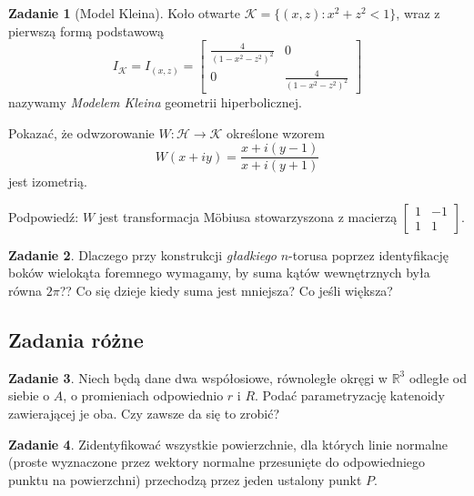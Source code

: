 \documentclass[a4paper,11pt]{article}
\theoremstyle{definition}\newtheorem{exercise}{Zadanie}
\theoremstyle{definition}\newtheorem{remark}{Uwaga}
\begin{document}
\begin{exercise}[Model Kleina]
Koło otwarte $\mathcal{K}=\{(x,z)\colon x^2 + z ^2 < 1\}$, wraz z pierwszą 
formą podstawową
\[I_{\mathcal{K}}=I_{(x,z)}
=\left[
\begin{array}{cc}
\frac{4}{(1-x^2-z^2)^2} & 0\\
0 & \frac{4}{(1-x^2-z^2)^2}
\end{array}
\right]
\]
nazywamy \textit{Modelem Kleina} geometrii hiperbolicznej.

Pokazać, że odwzorowanie $W\colon \mathcal{H}\to \mathcal{K}$ określone wzorem
\[W(x+iy)=\frac{x+i(y-1)}{x+i(y+1)}\]jest izometrią.

\small{Podpowiedź: $W$ jest transformacja M\"obiusa stowarzyszona z 
macierzą 
$\left[
\begin{array}{cc}
1 &-1\\
1 & 1
\end{array}
\right].$}

\end{exercise}

\begin{exercise}
Dlaczego przy konstrukcji \textit{gładkiego} $n$\nobreakdash-torusa poprzez 
identyfikację bok\'ow wielokąta foremnego wymagamy, by suma kąt\'ow 
wewnętrznych była r\'owna $2\pi$?? Co się dzieje kiedy suma jest mniejsza? Co 
jeśli większa?
\end{exercise}



\subsection{Zadania r\'ożne}
\begin{exercise}
Niech będą dane dwa współosiowe, równoległe okręgi w $\mathbb{R}^3$ odległe od siebie o $A$, o promieniach odpowiednio $r$ i $R$. Podać parametryzację katenoidy zawierającej je oba. Czy zawsze da się to zrobić?
\end{exercise}


\begin{exercise}
Zidentyfikować wszystkie powierzchnie, dla których linie normalne (proste 
wyznaczone przez wektory normalne przesunięte do odpowiedniego punktu na 
powierzchni) przechodzą przez jeden ustalony punkt $P$.
\end{exercise}
\end{document}
